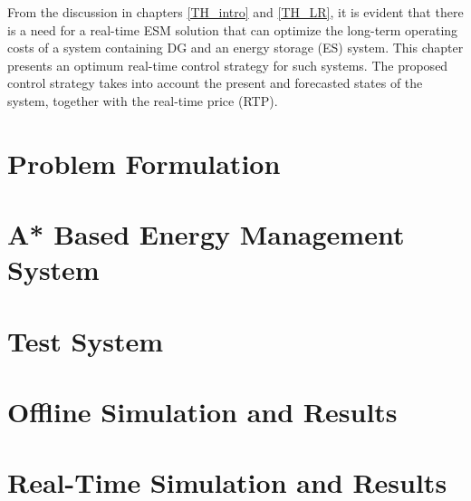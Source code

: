 From the discussion in chapters \ref{TH_intro} and \ref{TH_LR}, it is evident that there is a need for a real-time ESM solution that can optimize the long-term operating costs of a system containing DG and an energy storage (ES) system. This chapter presents an optimum real-time control strategy for such systems. The proposed control strategy takes into account the present and forecasted states of the system, together with the real-time price (RTP).


\section{Problem Formulation} \label{formulation}


\section{A* Based Energy Management System} \label{A*}


\section{Test System} \label{sys}


\section{Offline Simulation and Results} \label{OFF}


\section{Real-Time Simulation and Results} \label{RT}


